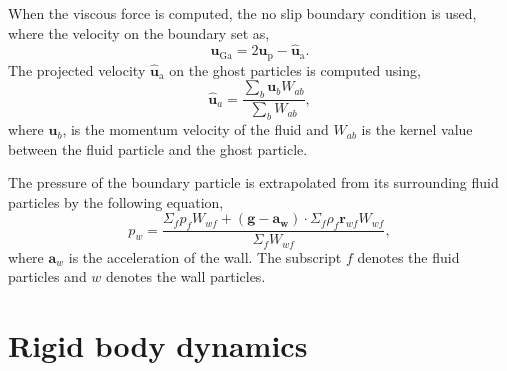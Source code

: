 \documentclass[preprint,12pt]{elsarticle}
\newcommand{\ten}[1]{\ensuremath{\mathbf{#1}}}
\begin{document}
When the viscous force is computed, the no slip boundary condition is used,
where the velocity on the boundary set as,
\begin{equation}
  \label{eq:no-slip-bc-u}
  \ten{u}_{\text{Ga}} = 2 \ten{u}_{\text{p}} - \ten{\hat{u}}_{\text{a}}.
\end{equation}
The projected velocity $\ten{\hat{u}}_{\text{a}}$ on the ghost particles is
computed using,
\begin{equation}
  \label{eq:v-ghost}
  \ten{\hat{u}}_a = \frac{\sum_b\ten{u}_b W_{ab}}{\sum_b W_{ab}},
\end{equation}
where $\ten{u}_b$, is the momentum velocity
of the fluid and $W_{ab}$ is the kernel value between the fluid
particle and the ghost particle.


The pressure of the boundary particle is extrapolated from its surrounding
fluid particles by the following equation,
\begin{equation}
  \label{eq:pressure-bc}
  p_w = \frac{\Sigma_f p_f W_{wf} + (\ten{g} - \ten{a}_{\ten{w}}) \cdot \Sigma_f
    \rho_f \ten{r}_{wf} W_{wf}}{\Sigma_f W_{wf}},
\end{equation}
where $\ten{a}_w$ is the acceleration of the wall. The subscript $f$ denotes
the fluid particles and $w$ denotes the wall particles.



\FloatBarrier%
\section{Rigid body dynamics}
\label{sec:rbd}

\end{document}
